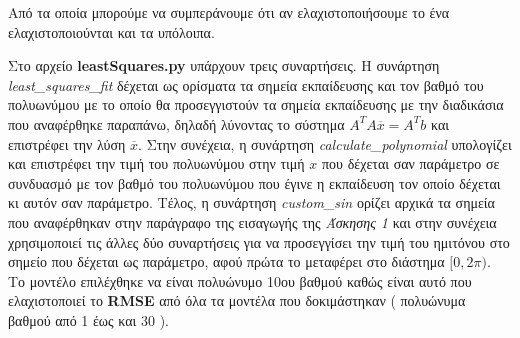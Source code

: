 \documentclass[Second Project.tex]{subfiles}
\begin{document}
Από τα οποία μπορούμε να συμπεράνουμε ότι αν ελαχιστοποιήσουμε το ένα ελαχιστοποιούνται και τα υπόλοιπα.
\par Στο αρχείο \textlatin{\textbf{leastSquares.py}} υπάρχουν τρεις συναρτήσεις. Η συνάρτηση 
\textlatin{\textit{least\_squares\_fit}} δέχεται ως ορίσματα τα σημεία εκπαίδευσης και τον βαθμό του πολυωνύμου με το
οποίο θα προσεγγιστούν τα σημεία εκπαίδευσης με την διαδικάσια που αναφέρθηκε παραπάνω, δηλαδή λύνοντας το σύστημα
$A^{T}A\overline{x} = A^{T}b$ και επιστρέφει την λύση $\overline{x}$. Στην συνέχεια, η συνάρτηση 
\textlatin{\textit{calculate\_polynomial}} υπολογίζει και επιστρέφει την τιμή του πολυωνύμου στην τιμή $x$ που δέχεται
σαν παράμετρο σε συνδυασμό με τον βαθμό του πολυωνύμου που έγινε η εκπαίδευση τον οποίο δέχεται κι αυτόν σαν
παράμετρο.  Τέλος, η συνάρτηση \textlatin{\textit{custom\_sin}} ορίζει αρχικά τα σημεία που αναφέρθηκαν στην παράγραφο
 της εισαγωγής της \textit{Άσκησης 1} και στην συνέχεια χρησιμοποιεί τις άλλες δύο συναρτήσεις για να προσεγγίσει την
  τιμή του ημιτόνου στο σημείο που δέχεται ως παράμετρο, αφού πρώτα το μεταφέρει στο διάστημα $[0,2\pi)$. Το μοντέλο 
επιλέχθηκε να είναι πολυώνυμο 10ου βαθμού καθώς είναι αυτό που ελαχιστοποιεί το \textlatin{\textbf{RMSE}} από όλα τα
μοντέλα που δοκιμάστηκαν ( πολυώνυμα βαθμού από 1 έως και 30 ).
\newpage
\end{document}
